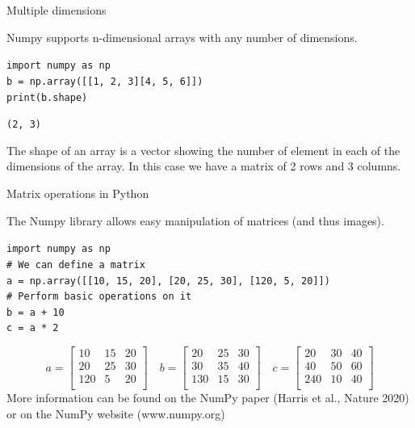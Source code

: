 \documentclass[9pt, aspectratio=169]{beamer}
\begin{document}
\begin{frame}
    {Multiple dimensions}

    Numpy supports n-dimensional arrays with any number of dimensions.

    \begin{codebox}
        \texttt{import numpy as np\\
            b = np.array([[1, 2, 3][4, 5, 6]])\\
            print(b.shape)
        }
    \end{codebox}

    \begin{codebox}
        {
            \texttt{(2, 3)}
        }
    \end{codebox}

    The shape of an array is a vector showing the number of element in each of the dimensions of the array. In this case we have a matrix of 2 rows and 3 columns.
\end{frame}


\begin{frame}
    {Matrix operations in Python}

    The Numpy library allows easy manipulation of matrices (and thus images).

    \begin{codebox}
        \texttt{import numpy as np\\
            \# We can define a matrix\\
            a = np.array([[10, 15, 20],
                    [20, 25, 30],
                    [120, 5, 20]])\\
            \# Perform basic operations on it\\
            b = a + 10\\
            c = a * 2
        }
    \end{codebox}
    \pause
    $$
        a =
        \begin{bmatrix}
            10  & 15 & 20 \\
            20  & 25 & 30 \\
            120 & 5  & 20 \\
        \end{bmatrix}
        \quad b =
        \begin{bmatrix}
            20  & 25 & 30 \\
            30  & 35 & 40 \\
            130 & 15 & 30 \\
        \end{bmatrix}
        \quad c =
        \begin{bmatrix}
            20  & 30 & 40 \\
            40  & 50 & 60 \\
            240 & 10 & 40 \\
        \end{bmatrix}
    $$
    \pause
    More information can be found on the NumPy paper (Harris et al., Nature 2020) or on the NumPy website (www.numpy.org)
\end{frame}
\end{document}
